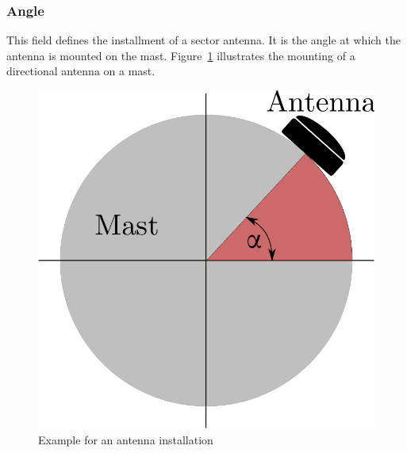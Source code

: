 \documentclass[master,english]{hgbthesis}
\begin{document}
\subsubsection{Angle}
This field defines the installment of a sector antenna. It is the angle at which the antenna is mounted on the mast. Figure~\ref{fig:antennaangle} illustrates the mounting of a directional antenna on a mast.
%
\begin{figure}
	\centering
	\includegraphics[width=0.4\linewidth]{./images/antennaangle}
	\caption{Example for an antenna installation}
	\label{fig:antennaangle}
\end{figure}
\end{document}

